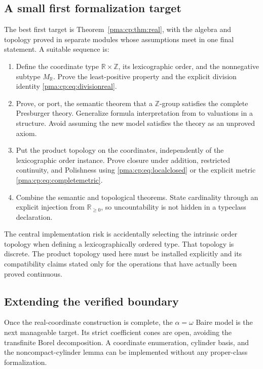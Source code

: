 \documentclass[11pt]{article}
\numberwithin{equation}{section}
\theoremstyle{definition}
\theoremstyle{remark}
\newcommand{\Z}{\mathbb Z}
\newcommand{\R}{\mathbb R}
\newcommand{\codeD}[1]{\texttt{\detokenize{#1}}}
\begin{document}
\subsection{A small first formalization target}

The best first target is Theorem~\ref{pma:cp:thm:real}, with the algebra and
topology proved in separate modules whose assumptions meet in one final
statement. A suitable sequence is:
\begin{enumerate}
\item Define the coordinate type $\R\times\Z$, its lexicographic order,
and the nonnegative subtype $M_{\R}$. Prove the least-positive property
and the explicit division identity \eqref{pma:cp:eq:divisionreal}.
\item Prove, or port, the semantic theorem that a $\Z$-group satisfies
the complete Presburger theory. Generalize formula interpretation from
\codeD{List Int} to valuations in a structure. Avoid assuming the new
model satisfies the theory as an unproved axiom.
\item Put the product topology on the coordinates, independently of the
lexicographic order instance. Prove closure under addition, restricted
continuity, and Polishness using \eqref{pma:cp:eq:localclosed} or the explicit
metric \eqref{pma:cp:eq:completemetric}.
\item Combine the semantic and topological theorems. State cardinality
through an explicit injection from $\R_{\geq0}$, so uncountability is
not hidden in a typeclass declaration.
\end{enumerate}

The central implementation risk is accidentally selecting the intrinsic
order topology when defining a lexicographically ordered type. That
topology is discrete. The product topology used here must be installed
explicitly and its compatibility claims stated only for the operations
that have actually been proved continuous.

\subsection{Extending the verified boundary}

Once the real-coordinate construction is complete, the $\alpha=\omega$
Baire model is the next manageable target. Its strict coefficient cones
are open, avoiding the transfinite Borel decomposition. A coordinate
enumeration, cylinder basis, and the noncompact-cylinder lemma can be
implemented without any proper-class formalization.
\end{document}
